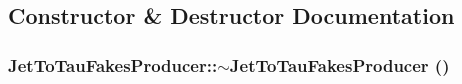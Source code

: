 \subsection{Constructor \& Destructor Documentation}
\hypertarget{classJetToTauFakesProducer_aaa7230e62295af44eaa2abcfa30dd1f7}{
\subsubsection[{$\sim$JetToTauFakesProducer}]{\setlength{\rightskip}{0pt plus 5cm}JetToTauFakesProducer::$\sim$JetToTauFakesProducer ()}}
\label{classJetToTauFakesProducer_aaa7230e62295af44eaa2abcfa30dd1f7}


